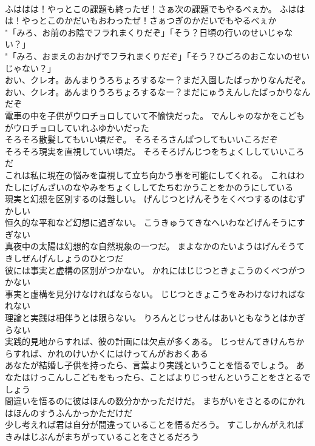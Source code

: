 \documentclass[8pt]{extreport}
\begin{document}
\begin{CJK}{UTF8}{min}
\\	ふははは！やっとこの課題も終ったぜ！さぁ次の課題でもやるべぇか。	ふははは！やっとこのかだいもおわったぜ！さぁつぎのかだいでもやるべぇか 
\\	"「みろ、お前のお陰でフラれまくりだぞ」「そう？日頃の行いのせいじゃない？」 
\\	"「みろ、おまえのおかげでフラれまくりだぞ」「そう？ひごろのおこないのせいじゃない？」 
\\	おい、クレオ。あんまりうろちょろするなー？まだ入園したばっかりなんだぞ。	おい、クレオ。あんまりうろちょろするなー？まだにゅうえんしたばっかりなんだぞ 
\\	電車の中を子供がウロチョロしていて不愉快だった。	でんしゃのなかをこどもがウロチョロしていれふゆかいだった 
\\	そろそろ散髪してもいい頃だぞ。	そろそろさんぱつしてもいいころだぞ 
\\	そろそろ現実を直視していい頃だ。	そろそろげんじつをちょくししていいころだ 
\\	これは私に現在の悩みを直視して立ち向かう事を可能にしてくれる。	これはわたしにげんざいのなやみをちょくししてたちむかうことをかのうにしている 
\\	現実と幻想を区別するのは難しい。	げんじつとげんそうをくべつするのはむずかしい 
\\	恒久的な平和など幻想に過ぎない。	こうきゅうてきなへいわなどげんそうにすぎない 
\\	真夜中の太陽は幻想的な自然現象の一つだ。	まよなかのたいようはげんそうてきしぜんげんしょうのひとつだ 
\\	彼には事実と虚構の区別がつかない。	かれにはじじつときょこうのくべつがつかない 
\\	事実と虚構を見分けなければならない。	じじつときょこうをみわけなければなれない 
\\	理論と実践は相伴うとは限らない。	りろんとじっせんはあいともなうとはかぎらない 
\\	実践的見地からすれば、彼の計画には欠点が多くある。	じっせんてきけんちからすれば、かれのけいかくにはけってんがおおくある 
\\	あなたが結婚し子供を持ったら、言葉より実践ということを悟るでしょう。	あなたはけっこんしこどもをもったら、ことばよりじっせんということをさとるでしょう 
\\	間違いを悟るのに彼はほんの数分かかっただけだ。	まちがいをさとるのにかれはほんのすうふんかっかただけだ 
\\	少し考えれば君は自分が間違っていることを悟るだろう。	すこしかんがえればきみはじぶんがまちがっていることをさとるだろう 

\end{CJK}
\end{document}
